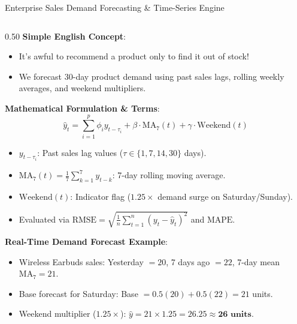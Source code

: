 \documentclass[10pt]{beamer}
\begin{document}
\begin{frame}[fragile]{Enterprise Sales Demand Forecasting \& Time-Series Engine}
\begin{columns}[T]
    \begin{column}{0.50\textwidth}
        {\color{brandred}\textbf{Simple English Concept}}:
        \begin{itemize}\scriptsize
            \item It's awful to recommend a product only to find it out of stock!
            \item We forecast 30-day product demand using past sales lags, rolling weekly averages, and weekend multipliers.
        \end{itemize}
        {\color{brandorange}\textbf{Mathematical Formulation \& Terms}}:
        \begin{equation*}
            \hat{y}_{t} = \sum_{i=1}^p \phi_i y_{t - \tau_i} + \beta \cdot \text{MA}_{7}(t) + \gamma \cdot \text{Weekend}(t)
        \end{equation*}
        \begin{itemize}\scriptsize
            \item $y_{t - \tau_i}$: Past sales lag values ($\tau \in \{1, 7, 14, 30\}$ days).
            \item $\text{MA}_7(t) = \frac{1}{7}\sum_{k=1}^7 y_{t-k}$: 7-day rolling moving average.
            \item $\text{Weekend}(t)$: Indicator flag ($1.25\times$ demand surge on Saturday/Sunday).
            \item Evaluated via $\text{RMSE} = \sqrt{\frac{1}{n}\sum_{t=1}^n (y_t - \hat{y}_t)^2}$ and $\text{MAPE}$.
        \end{itemize}
        {\color{brandred}\textbf{Real-Time Demand Forecast Example}}:
        \begin{itemize}\scriptsize
            \item Wireless Earbuds sales: Yesterday $= 20$, 7 days ago $= 22$, 7-day mean $\text{MA}_7 = 21$.
            \item Base forecast for Saturday: Base $= 0.5(20) + 0.5(22) = 21$ units.
            \item Weekend multiplier ($1.25\times$): $\hat{y} = 21 \times 1.25 = \mathbf{26.25} \approx \mathbf{26\text{ units}}$.
        \end{itemize}

\end{column}
\end{columns}
\end{frame}
\end{document}
